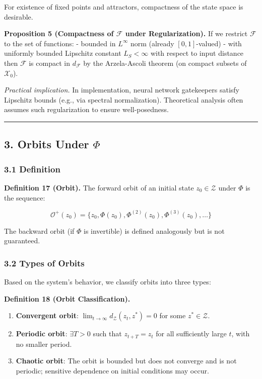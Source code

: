 \documentclass[
  12pt,
]{ctexart}
\providecommand{\tightlist}{%
  \setlength{\itemsep}{0pt}\setlength{\parskip}{0pt}}
\begin{document}
For existence of fixed points and attractors, compactness of the state
space is desirable.

\textbf{Proposition 5 (Compactness of \(\mathcal{F}\) under
Regularization).} If we restrict \(\mathcal{F}\) to the set of
functions: - bounded in \(L^\infty\) norm (already \([0,1]\)-valued) -
with uniformly bounded Lipschitz constant \(L_S < \infty\) with respect
to input distance then \(\mathcal{F}\) is compact in \(d_{\mathcal{F}}\)
by the Arzela-Ascoli theorem (on compact subsets of \(\mathcal{X}_0\)).

\emph{Practical implication.} In implementation, neural network
gatekeepers satisfy Lipschitz bounds (e.g., via spectral normalization).
Theoretical analysis often assumes such regularization to ensure
well-posedness.

\begin{center}\rule{0.5\linewidth}{0.5pt}\end{center}

\subsection{\texorpdfstring{3. Orbits Under
\(\Phi\)}{3. Orbits Under \textbackslash Phi}}\label{orbits-under-phi}

\subsubsection{3.1 Definition}\label{definition}

\textbf{Definition 17 (Orbit).} The forward orbit of an initial state
\(z_0 \in \mathcal{Z}\) under \(\Phi\) is the sequence:

\[\mathcal{O}^+(z_0) = \{ z_0, \Phi(z_0), \Phi^{(2)}(z_0), \Phi^{(3)}(z_0), \dots \}\]

The backward orbit (if \(\Phi\) is invertible) is defined analogously
but is not guaranteed.

\subsubsection{3.2 Types of Orbits}\label{types-of-orbits}

Based on the system's behavior, we classify orbits into three types:

\textbf{Definition 18 (Orbit Classification).}

\begin{enumerate}
\def\labelenumi{\arabic{enumi}.}
\tightlist
\item
  \textbf{Convergent orbit}:
  \(\lim_{t\to\infty} d_{\mathcal{Z}}(z_t, z^*) = 0\) for some
  \(z^* \in \mathcal{Z}\).
\item
  \textbf{Periodic orbit}: \(\exists T > 0\) such that \(z_{t+T} = z_t\)
  for all sufficiently large \(t\), with no smaller period.
\item
  \textbf{Chaotic orbit}: The orbit is bounded but does not converge and
  is not periodic; sensitive dependence on initial conditions may occur.
\end{enumerate}
\end{document}
